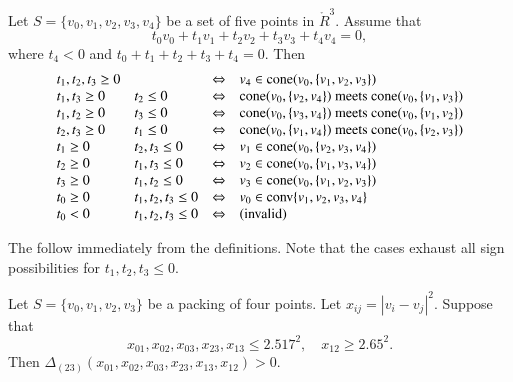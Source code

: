 \begin{tarskidata}
\begin{tarski}
\begin{lemma}
Let $S=\{v_0,v_1,v_2,v_3,v_4\}$ be a set of five points in
$\ring{R}^3$.
Assume that
   $$
   t_0 v_0 + t_1 v_1 + t_2 v_2 + t_3 v_3 + t_4 v_4 = 0,
   $$
where $t_4 < 0$ and $t_0+t_1+t_2+t_3+t_4=0$.
Then
   $$
   \def\lr{\Leftrightarrow}
   \def\m{ \text{ meets } }
   \def\cc{\op{cone}}
   \begin{array}{llcl}
  t_1,t_2,t_3\ge 0  &      &\lr& v_4\in\cc(v_0,\{v_1,v_2,v_3\})\\
  t_1,t_3\ge 0 & t_2\le 0  &\lr& \cc(v_0,\{v_2,v_4\})\m\cc(v_0,\{v_1,v_3\})\\
  t_1,t_2\ge 0 & t_3\le 0  &\lr& \cc(v_0,\{v_3,v_4\})\m\cc(v_0,\{v_1,v_2\})\\
  t_2,t_3\ge 0 & t_1\le 0  &\lr& \cc(v_0,\{v_1,v_4\})\m\cc(v_0,\{v_2,v_3\})\\
  t_1\ge0     & t_2,t_3\le0&\lr& v_1\in\cc(v_0,\{v_2,v_3,v_4\})\\
  t_2\ge0     & t_1,t_3\le0&\lr& v_2\in\cc(v_0,\{v_1,v_3,v_4\})\\
  t_3\ge0     & t_1,t_2\le0&\lr& v_3\in\cc(v_0,\{v_1,v_2,v_3\})\\
  t_0\ge0  &t_1,t_2,t_3\le0&\lr& v_0\in\op{conv}\{v_1,v_2,v_3,v_4\}\\
  t_0 < 0  &t_1,t_2,t_3\le0&\lr&\hbox{(invalid)}\\
   \end{array}
   $$
\end{lemma}

\begin{proved}
The follow immediately from the definitions.
Note that the cases exhaust all sign possibilities for $t_1,t_2,t_3\le 0$.
\swallowed\end{proved}
\end{tarski}








\begin{tarski}

\begin{lemma}
Let $S=\{v_0,v_1,v_2,v_3\}$ be a packing of four
points.
Let $x_{ij}=|v_i-v_j|^2$.
 Suppose that
$$
x_{01},x_{02},x_{03},x_{23},x_{13}\le 2.517^2,\quad x_{12}\ge 2.65^2.
$$
Then $\Delta_{(23)}(x_{01},x_{02},x_{03},x_{23},x_{13},x_{12})>0$.
\end{lemma}


\end{tarski}
\end{tarskidata}
